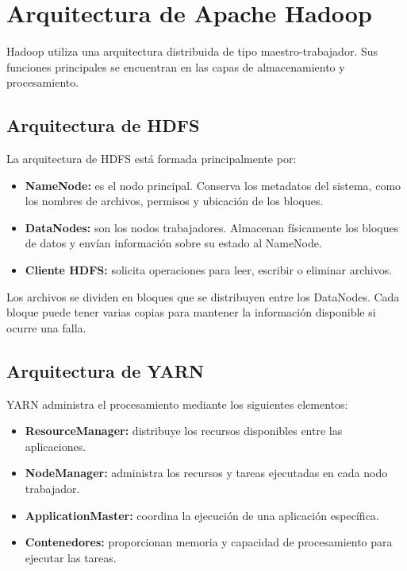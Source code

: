 \section{Arquitectura de Apache Hadoop}

Hadoop utiliza una arquitectura distribuida de tipo maestro-trabajador. Sus
funciones principales se encuentran en las capas de almacenamiento y
procesamiento.

\subsection{Arquitectura de HDFS}

La arquitectura de HDFS está formada principalmente por:

\begin{itemize}
    \item \textbf{NameNode:} es el nodo principal. Conserva los metadatos del
    sistema, como los nombres de archivos, permisos y ubicación de los bloques.

    \item \textbf{DataNodes:} son los nodos trabajadores. Almacenan físicamente
    los bloques de datos y envían información sobre su estado al NameNode.

    \item \textbf{Cliente HDFS:} solicita operaciones para leer, escribir o
    eliminar archivos.
\end{itemize}

Los archivos se dividen en bloques que se distribuyen entre los DataNodes.
Cada bloque puede tener varias copias para mantener la información disponible
si ocurre una falla.

\subsection{Arquitectura de YARN}

YARN administra el procesamiento mediante los siguientes elementos:

\begin{itemize}
    \item \textbf{ResourceManager:} distribuye los recursos disponibles entre
    las aplicaciones.

    \item \textbf{NodeManager:} administra los recursos y tareas ejecutadas en
    cada nodo trabajador.

    \item \textbf{ApplicationMaster:} coordina la ejecución de una aplicación
    específica.

    \item \textbf{Contenedores:} proporcionan memoria y capacidad de
    procesamiento para ejecutar las tareas.
\end{itemize}

